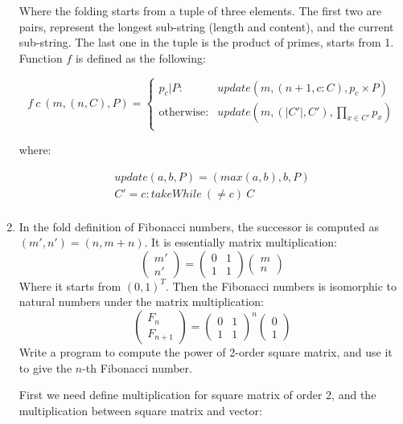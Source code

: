 \documentclass[UTF8]{article}
\begin{document}
\begin{enumerate}
Where the folding starts from a tuple of three elements. The first two are pairs, represent the longest sub-string (length and content), and the current sub-string. The last one in the tuple is the product of primes, starts from 1. Function $f$ is defined as the following:

\[
f\ c\ (m, (n, C), P) = \begin{cases}
  p_c | P : & update(m, (n + 1, c : C), p_c \times P) \\
  \text{otherwise}: & update(m, (|C'|, C'), \displaystyle \prod_{x \in C'} p_x) \\
\end{cases}
\]

where:

\[ \begin{array}{l}
update(a, b, P) = (max(a, b), b, P) \\
C' = c : takeWhile\ (\neq c)\ C \\
\end{array} \]

\item {In the fold definition of Fibonacci numbers, the successor is computed as $(m', n') = (n, m + n)$. It is essentially matrix multiplication:
\[
\begin{pmatrix} m' \\ n' \end{pmatrix} =
\begin{pmatrix} 0 & 1 \\ 1 & 1 \end{pmatrix}
\begin{pmatrix} m \\ n \end{pmatrix}
\]
Where it starts from $(0, 1)^T$. Then the Fibonacci numbers is isomorphic to natural numbers under the matrix multiplication:
\[
\begin{pmatrix}F_n \\ F_{n+1} \end{pmatrix} = \begin{pmatrix} 0 & 1 \\ 1 & 1 \end{pmatrix}^n\begin{pmatrix} 0 \\ 1 \end{pmatrix}
\]
Write a program to compute the power of 2-order square matrix, and use it to give the $n$-th Fibonacci number.}

First we need define multiplication for square matrix of order 2, and the multiplication between square matrix and vector:


\end{enumerate}
\end{document}
